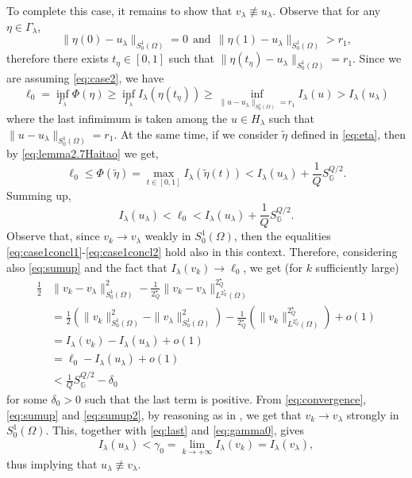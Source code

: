 \documentclass[11pt]{amsart}
\numberwithin{equation}{section} %
\theoremstyle{definition}
\def\G{\mathbb{G}}
\newcommand{\m}{\mbox}
\begin{document}
To complete this case, it remains to show that $v_\lambda\not \equiv u_\lambda$.
Observe that for any $\eta\in \Gamma_\lambda$,
\[
\|\eta(0)-u_\lambda\|_{S^{1}_{0}(\Omega)}=0\ \ \m{and}\ \ \|\eta(1)-u_\lambda\|_{S^{1}_{0}(\Omega)}>r_1,
\]
therefore there exists $t_\eta\in [0,1]$
such that $\|\eta(t_\eta)-u_\lambda\|_{S^{1}_{0}(\Omega)}=r_1$.
Since we are assuming \eqref{eq:case2},
we have
\[
\ell_0=\inf_{\Gamma_\lambda}\Phi(\eta)\geq\inf_{\Gamma_\lambda}I_\lambda(\eta(t_\eta))
\geq\inf_{\|u-u_\lambda\|_{S^{1}_{0}(\Omega)}=r_1} I_\lambda(u)>I_\lambda(u_\lambda)
\]
where the last infimimum is taken among the $u\in H_\lambda$
such that $\|u-u_\lambda\|_{S^{1}_{0}(\Omega)}=r_1$. At the same time,
if we consider $\widetilde\eta$ defined in \eqref{eq:eta},
then by \eqref{eq:lemma2.7Haitao}
we get,
\[
\ell_0\leq \Phi(\widetilde \eta)=\max_{t\in [0,1]}I_\lambda(\widetilde \eta(t))<
I_\lambda(u_\lambda)+\frac{1}{Q}S_\G^{Q\slash2}.
\]
Summing up,
\begin{equation}\label{eq:sumup}
	I_\lambda(u_\lambda)<\ell_0<I_\lambda(u_\lambda)+\frac{1}{Q}S_\G^{Q\slash2}.
\end{equation}
Observe that, since $v_k\to v_\lambda$ weakly in $S^1_0(\Omega)$, then
the equalities \eqref{eq:case1concl1}-\eqref{eq:case1concl2} hold also in this context.
Therefore, considering also \eqref{eq:sumup} and the fact that $I_\lambda(v_k)\to \ell_0$,
we get (for $k$ sufficiently large)
\begin{equation}\label{eq:sumup2}
	\begin{split}
		\frac{1}{2}&\|v_k-v_\lambda\|_{S^{1}_{0}(\Omega)}^2-\frac{1}{2^\star_Q}\|v_k-v_\lambda\|_{L^{2^\star_Q}(\Omega)}^{2^\star_Q}\\
		&=\frac{1}{2}(\|v_k\|_{S^{1}_{0}(\Omega)}^2-\|v_\lambda\|_{S^{1}_{0}(\Omega)}^2)-\frac{1}{2^\star_Q}(\|v_k\|^{2^\star_Q}_{L^{2^\star_Q}(\Omega)})+o(1)\\
		&=I_\lambda(v_k)-I_\lambda(u_\lambda)+o(1)\\
		&=\ell_0-I_\lambda(u_\lambda)+o(1)\\
		&<\frac{1}{Q}S_\G^{Q\slash2}-\delta_0
	\end{split}
\end{equation}
for some $\delta_0>0$ such that the last term is positive.
From \eqref{eq:convergence}, \eqref{eq:sumup} and \eqref{eq:sumup2},
by reasoning as in \cite[Proposition 3.1]{Tarantello},
we get that $v_k\to v_\lambda$ strongly in $S^1_0(\Omega)$.
This, together with \eqref{eq:last} and \eqref{eq:gamma0}, gives
\[
I_\lambda(u_\lambda)<\gamma_0=\lim_{k\to+\infty}I_\lambda(v_k)=I_\lambda(v_\lambda),
\]
thus implying that $u_\lambda\not\equiv v_\lambda$.\newline
\medskip
\end{document}
